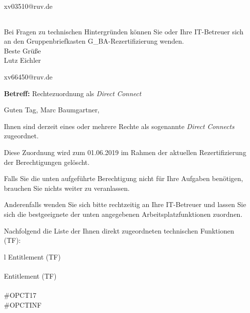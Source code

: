 \documentclass[a4paper,landscape,12pt]{letter}
\begin{document}
\begin{letter}{xv03510@ruv.de\hfill \break}
\begin{tiny}
\begin{longtable}{|p{35mm}|p{15mm}|p{25mm}|p{10mm}|p{40mm}|p{50mm}|p{50mm}|}
\hline
		\end{longtable}
		\end{tiny}
	
\begin{minipage}{\textwidth}
			Bei Fragen zu technischen Hintergründen können Sie 
			oder Ihre IT-Betreuer sich an den Gruppenbriefkasten 
			G\_BA-Rezertifizierung
			wenden.\\
			\linebreak
			Beste Grüße\\
			Lutz Eichler
	\end{minipage}
	\end{letter}
	
\begin{letter}{xv66450@ruv.de\hfill \break}
\begin{normalsize}
	\opening{\textbf{Betreff:} Rechtezuordnung als \emph{Direct Connect}}
	\begin{normalsize} \hfill
	\end{normalsize}

	\begin{normalsize}
		Guten Tag, 
	Marc Baumgartner, \hfill \break
	\end{normalsize}
	\end{normalsize}
	
\begin{normalsize}
	Ihnen sind derzeit eines oder mehrere Rechte als sogenannte \emph{Direct Connects} zugeordnet.
	
	Diese Zuordnung wird zum 01.06.2019 im Rahmen der aktuellen Rezertifizierung der Berechtigungen gelöscht.
	
	Falls Sie die unten aufgeführte Berechtigung nicht für Ihre Aufgaben benötigen, 
	brauchen Sie nichts weiter zu veranlassen.
	
	Anderenfalls wenden Sie sich bitte rechtzeitig an Ihre IT-Betreuer 
	und lassen Sie sich die bestgeeignete der unten angegebenen Arbeitsplatzfunktionen zuordnen.
	\end{normalsize}
	
\begin{normalsize}
	Nachfolgend die Liste der Ihnen direkt zugeordneten technischen Funktionen (TF):

	\begin{longtable}{l}
		Entitlement (TF) \\ \hline
		\endfirsthead
		\\\hline
		Entitlement (TF) \\ \hline
		\endhead %
		\multicolumn{1}{r@{}}{Fortsetzung \ldots}\\
		\endfoot
		\hline
		\endlastfoot
	\#OPCT17\\\#OPCTINF\\
	\end{longtable}
	\end{normalsize}
	

\end{letter}
\end{document}
